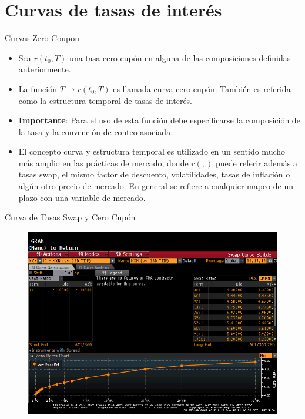\documentclass[11pt]{beamer}
\begin{document}
\section{Curvas de tasas de interés}
\begin{frame}{Curvas Zero Coupon}
	\begin{itemize}
		\item Sea $r(t_0,T)$ una tasa cero cupón en alguna de las composiciones definidas anteriormente.
		
		\item La función $T \rightarrow r(t_0,T)$ es llamada curva cero cupón. También es referida como la estructura temporal de tasas de interés.  
		
		\item \textbf{Importante}: Para el uso de esta función debe especificarse la composición de la tasa y la convención de conteo asociada.
		
		\item El concepto curva y estructura temporal es utilizado en un sentido mucho más amplio en las  prácticas de mercado, donde $r(,)$ puede referir además a tasas swap, el mismo factor de descuento, volatilidades, tasas de inflación o algún otro precio de mercado. En general se refiere a cualquier mapeo de un plazo con una variable de mercado.
		
	\end{itemize}
\end{frame}
\begin{frame}{Curva de Tasas Swap y Cero Cupón}
	\begin{figure}
		\centering
		\includegraphics[width=.9\linewidth]{swap_curve}
		
		\label{fig:swapcurve}
	\end{figure}
\end{frame}
\end{document}

